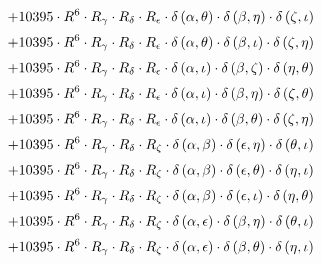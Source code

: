 \begin{subequations}
\begin{gather}
 \\[0.2em] \notag 		 + 10395 \cdot R^{6} \cdot R_{\gamma{}} \cdot R_{\delta{}} \cdot R_{\epsilon{}} \cdot \delta{}\left(\alpha{}, \theta{}\right) \cdot \delta{}\left(\beta{}, \eta{}\right) \cdot \delta{}\left(\zeta{}, \iota{}\right) 
 \\[0.2em] \notag 		 + 10395 \cdot R^{6} \cdot R_{\gamma{}} \cdot R_{\delta{}} \cdot R_{\epsilon{}} \cdot \delta{}\left(\alpha{}, \theta{}\right) \cdot \delta{}\left(\beta{}, \iota{}\right) \cdot \delta{}\left(\zeta{}, \eta{}\right) 
 \\[0.2em] \notag 		 + 10395 \cdot R^{6} \cdot R_{\gamma{}} \cdot R_{\delta{}} \cdot R_{\epsilon{}} \cdot \delta{}\left(\alpha{}, \iota{}\right) \cdot \delta{}\left(\beta{}, \zeta{}\right) \cdot \delta{}\left(\eta{}, \theta{}\right) 
 \\[0.2em] \notag 		 + 10395 \cdot R^{6} \cdot R_{\gamma{}} \cdot R_{\delta{}} \cdot R_{\epsilon{}} \cdot \delta{}\left(\alpha{}, \iota{}\right) \cdot \delta{}\left(\beta{}, \eta{}\right) \cdot \delta{}\left(\zeta{}, \theta{}\right) 
 \\[0.2em] \notag 		 + 10395 \cdot R^{6} \cdot R_{\gamma{}} \cdot R_{\delta{}} \cdot R_{\epsilon{}} \cdot \delta{}\left(\alpha{}, \iota{}\right) \cdot \delta{}\left(\beta{}, \theta{}\right) \cdot \delta{}\left(\zeta{}, \eta{}\right) 
 \\[0.2em] \notag 		 + 10395 \cdot R^{6} \cdot R_{\gamma{}} \cdot R_{\delta{}} \cdot R_{\zeta{}} \cdot \delta{}\left(\alpha{}, \beta{}\right) \cdot \delta{}\left(\epsilon{}, \eta{}\right) \cdot \delta{}\left(\theta{}, \iota{}\right) 
 \\[0.2em] \notag 		 + 10395 \cdot R^{6} \cdot R_{\gamma{}} \cdot R_{\delta{}} \cdot R_{\zeta{}} \cdot \delta{}\left(\alpha{}, \beta{}\right) \cdot \delta{}\left(\epsilon{}, \theta{}\right) \cdot \delta{}\left(\eta{}, \iota{}\right) 
 \\[0.2em] \notag 		 + 10395 \cdot R^{6} \cdot R_{\gamma{}} \cdot R_{\delta{}} \cdot R_{\zeta{}} \cdot \delta{}\left(\alpha{}, \beta{}\right) \cdot \delta{}\left(\epsilon{}, \iota{}\right) \cdot \delta{}\left(\eta{}, \theta{}\right) 
 \\[0.2em] \notag 		 + 10395 \cdot R^{6} \cdot R_{\gamma{}} \cdot R_{\delta{}} \cdot R_{\zeta{}} \cdot \delta{}\left(\alpha{}, \epsilon{}\right) \cdot \delta{}\left(\beta{}, \eta{}\right) \cdot \delta{}\left(\theta{}, \iota{}\right) 
 \\[0.2em] \notag 		 + 10395 \cdot R^{6} \cdot R_{\gamma{}} \cdot R_{\delta{}} \cdot R_{\zeta{}} \cdot \delta{}\left(\alpha{}, \epsilon{}\right) \cdot \delta{}\left(\beta{}, \theta{}\right) \cdot \delta{}\left(\eta{}, \iota{}\right) 

\end{gather}
\end{subequations}
